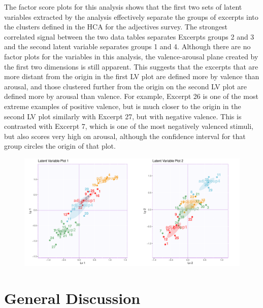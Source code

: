 \documentclass[
  english,
  man,floatsintext]{apa6}
\begin{document}
The factor score plots for this analysis shows that the first two sets of latent variables extracted by the analysis effectively separate the groups of excerpts into the clusters defined in the HCA for the adjectives survey. The strongest correlated signal between the two data tables separates Excerpts groups 2 and 3 and the second latent variable separates groups 1 and 4. Although there are no factor plots for the variables in this analysis, the valence-arousal plane created by the first two dimensions is still apparent.
This suggests that the excerpts that are more distant from the origin in the first LV plot are defined more by valence than arousal, and those clustered further from the origin on the second LV plot are defined more by arousal than valence. For example, Excerpt 26 is one of the most extreme examples of positive valence, but is much closer to the origin in the second LV plot similarly with Excerpt 27, but with negative valence. This is contrasted with Excerpt 7, which is one of the most negatively valenced stimuli, but also scores very high on arousal, although the confidence interval for that group circles the origin of that plot.

\begin{figure}

{\centering \includegraphics{Music-Descriptor-Space_files/figure-latex/factorplotsPLSC-1} 

}

\caption{ }\label{fig:factorplotsPLSC}
\end{figure}

\hypertarget{general-discussion}{%
\section{General Discussion}\label{general-discussion}}
\end{document}

